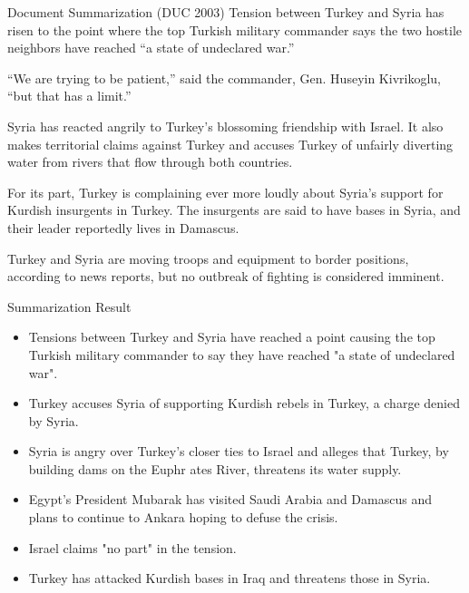 \documentclass{beamer}
\begin{document}
\begin{frame}[fragile]{Document Summarization (DUC 2003)}
   Tension between Turkey and Syria has risen to
the point where the top Turkish military commander says the two
hostile neighbors have reached ``a state of undeclared war.''

   ``We are trying to be patient,'' said the commander, Gen.
Huseyin Kivrikoglu, ``but that has a limit.''

   Syria has reacted angrily to Turkey's blossoming friendship with
Israel. It also makes territorial claims against Turkey and accuses
Turkey of unfairly diverting water from rivers that flow through
both countries.

   For its part, Turkey is complaining ever more loudly about
Syria's support for Kurdish insurgents in Turkey. The insurgents
are said to have bases in Syria, and their leader reportedly lives
in Damascus.

   Turkey and Syria are moving troops and equipment to border
positions, according to news reports, but no outbreak of fighting
is considered imminent.


\end{frame}

\begin{frame}{Summarization Result}

  \begin{itemize}
  \item 

  Tensions between Turkey and Syria have reached a point causing the top Turkish military commander to say 
they have reached "a state of undeclared war".                                                          

  \item Turkey accuses Syria of supporting Kurdish rebels in Turkey, a charge denied by Syria.

  \item Syria is angry over Turkey's closer ties to Israel and alleges that Turkey, by building dams on the Euphr
ates River, threatens its water supply.
                                                                 
  \item Egypt's President Mubarak has visited Saudi Arabia and Damascus and plans to continue to Ankara hoping to
 defuse the crisis. 
                                                                                     
  \item Israel claims "no part" in the tension. 

  \item  Turkey has attacked Kurdish bases in Iraq and threatens those in Syria.
  \end{itemize}
\end{frame}
\end{document}
